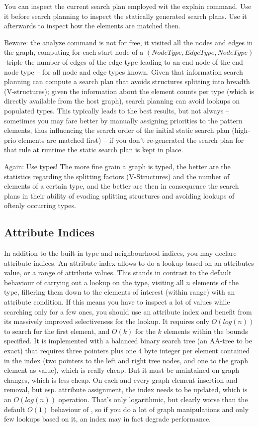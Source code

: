 You can inspect the current search plan employed wit the explain command.
Use it before search planning to inspect the statically generated search plans.
Use it afterwards to inspect how the elements are matched then.

Beware: the analyze command is not for free, it visited all the nodes and edges in the graph, computing for each start node of a $(NodeType, EdgeType, NodeType)$-triple the number of edges of the edge type leading to an end node of the end node type -- for all node and edge types known.
Given that information search planning can compute a search plan that avoids structures splitting into breadth (V-structures);
given the information about the element counts per type (which is directly available from the host graph), 
search planning can avoid lookups on populated types.
This typically leads to the best results, but not always -- sometimes you may fare better by manually assigning priorities to the pattern elements, thus influencing the search order of the initial static search plan (high-prio elements are matched first) -- if you don't re-generated the search plan for that rule at runtime the static search plan is kept in place.

Again: Use types!
The more fine grain a graph is typed, the better are the statistics regarding the splitting factors (V-Structures) and the number of elements of a certain type, and the better are then in consequence the search plans in their ability of evading splitting structures and avoiding lookups of oftenly occurring types.

\subsection{Attribute Indices}
In addition to the built-in type and neighbourhood indices, you may declare attribute indices.
An attribute index allows to do a lookup based on an attributes value, or a range of attribute values.
This stands in contrast to the default behaviour of carrying out a lookup on the type, visiting all $n$ elements of the type, filtering them down to the elements of interest (within range) with an attribute condition.
If this means you have to inspect a lot of values while searching only for a few ones, you should use an attribute index and benefit from its massively improved selectiveness for the lookup.
It requires only $O(log(n))$ to search for the first element, and $O(k)$ for the $k$ elements within the bounds specified.
It is implemented with a balanced binary search tree (an AA-tree\cite{Andersson93balancedsearch} to be exact) that requires three pointers plus one 4 byte integer per element contained in the index (two pointers to the left and right tree nodes, and one to the graph element as value), which is really cheap.
But it must be maintained on graph changes, which is less cheap.
On each and every graph element insertion and removal, but esp. attribute assignment, the index needs to be updated, which is an $O(log(n))$ operation.
That's only logarithmic, but clearly worse than the default $O(1)$ behaviour of \GrG{}, so if you do a lot of graph manipulations and only few lookups based on it, an index may in fact degrade performance.

